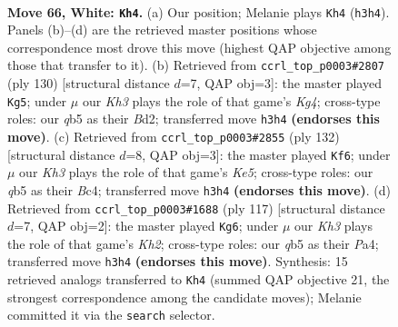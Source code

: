 \documentclass[11pt]{article}
\begin{document}
\clearpage

\begin{figure}[p]\centering
\begin{subfigure}{0.46\textwidth}\centering
\resizebox{\linewidth}{!}{%
\newchessgame
\chessboard[
  setfen={6kb/5p2/3P4/1q6/8/7K/8/8 w - - 1 66},
  showmover=false,
  pgfstyle=straightmove, color=movearrow, markmove={h3-h4}
]}
\caption{}
\end{subfigure}\hfill
\begin{subfigure}{0.46\textwidth}\centering
\resizebox{\linewidth}{!}{%
\newchessgame
\chessboard[
  setfen={8/1b6/1k6/2p5/6KP/8/3B4/8 w - - 0 66},
  showmover=false,
  pgfstyle=straightmove, color=movearrow, markmove={g4-g5}
]}
\caption{}
\end{subfigure}
\\[4pt]
\begin{subfigure}{0.46\textwidth}\centering
\resizebox{\linewidth}{!}{%
\newchessgame
\chessboard[
  setfen={bk6/8/8/2p1K3/2B5/6P1/8/8 w - - 7 67},
  showmover=false,
  pgfstyle=straightmove, color=movearrow, markmove={e5-f6}
]}
\caption{}
\end{subfigure}\hfill
\begin{subfigure}{0.46\textwidth}\centering
\resizebox{\linewidth}{!}{%
\newchessgame
\chessboard[
  setfen={8/7k/p3KB2/8/p7/P7/8/8 b - - 12 59},
  showmover=false,
  pgfstyle=straightmove, color=movearrow, markmove={h7-g6}
]}
\caption{}
\end{subfigure}
\caption{\textbf{Move 66, White: \texttt{Kh4}.} (a) Our position; Melanie plays \texttt{Kh4} (\texttt{h3h4}). Panels (b)--(d) are the retrieved master positions whose correspondence most drove this move (highest QAP objective among those that transfer to it). (b) Retrieved from \texttt{ccrl\_top\_p0003\#2807} (ply 130) [structural distance $d$=7, QAP obj=3]: the master played \texttt{Kg5}; under $\mu$ our \emph{Kh3} plays the role of that game's \emph{Kg4}; cross-type roles: our \emph{q}b5 as their \emph{B}d2; transferred move \texttt{h3h4} \textbf{(endorses this move)}. (c) Retrieved from \texttt{ccrl\_top\_p0003\#2855} (ply 132) [structural distance $d$=8, QAP obj=3]: the master played \texttt{Kf6}; under $\mu$ our \emph{Kh3} plays the role of that game's \emph{Ke5}; cross-type roles: our \emph{q}b5 as their \emph{B}c4; transferred move \texttt{h3h4} \textbf{(endorses this move)}. (d) Retrieved from \texttt{ccrl\_top\_p0003\#1688} (ply 117) [structural distance $d$=7, QAP obj=2]: the master played \texttt{Kg6}; under $\mu$ our \emph{Kh3} plays the role of that game's \emph{Kh2}; cross-type roles: our \emph{q}b5 as their \emph{P}a4; transferred move \texttt{h3h4} \textbf{(endorses this move)}. Synthesis: 15 retrieved analogs transferred to \texttt{Kh4} (summed QAP objective 21, the strongest correspondence among the candidate moves); Melanie committed it via the \texttt{search} selector.}
\label{fig:thought-m130}
\end{figure}
\end{document}
